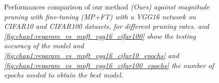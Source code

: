 \begin{figure}

    
  \caption{\centering Performances comparison of our method \em{(Ours)} against
  magnitude pruning with fine-tuning \em{(MP+FT)} with a VGG16 network on
  CIFAR10 and CIFAR100 datasets, for different pruning rates.
   and
  \cref{fig:chap1:reparam_vs_mpft_vgg16_cifar100} show the testing accuracy of
  the model and \cref{fig:chap1:reparam_vs_mpft_vgg16_cifar10_epochs} and
  \cref{fig:chap1:reparam_vs_mpft_vgg16_cifar100_epochs} the
  number of epochs needed to obtain the best model.}
  \label{fig:chap1:reparam_vs_mpft_vgg16}
\end{figure}

